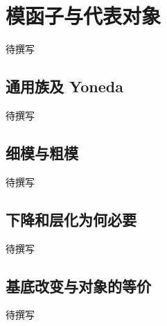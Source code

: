 
% 
% 

\section{模函子与代表对象}
\label{g5:sec:3301}

待撰写

\subsection{通用族及 Yoneda}
\label{g5:subsec:3301:01}
待撰写

\subsection{细模与粗模}
\label{g5:subsec:3301:02}
待撰写

\subsection{下降和层化为何必要}
\label{g5:subsec:3301:03}
待撰写

\subsection{基底改变与对象的等价}
\label{g5:subsec:3301:04}
待撰写
